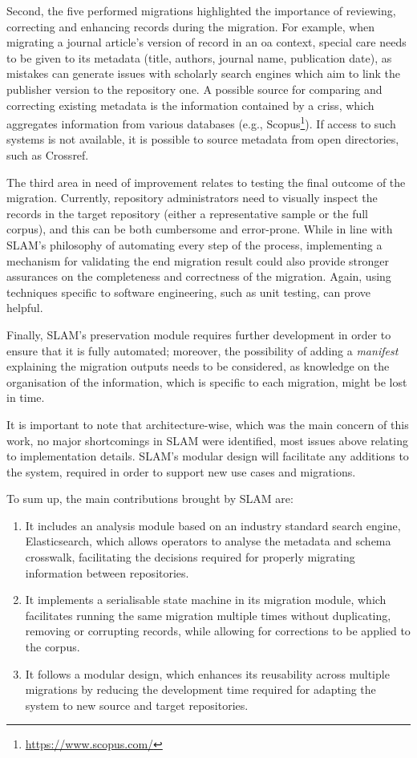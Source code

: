 Second, the five performed migrations highlighted the importance of reviewing, correcting and enhancing records during the migration. For example, when migrating a journal article's version of record in an \gls{oa} context, special care needs to be given to its metadata (title, authors, journal name, publication date), as mistakes can generate issues with scholarly search engines which aim to link the publisher version to the repository one. A possible source for comparing and correcting existing metadata is the information contained by a \glspl{cris}, which aggregates information from various databases (e.g., Scopus\footnote{\url{https://www.scopus.com/}}). If access to such systems is not available, it is possible to source metadata from open directories, such as Crossref.

The third area in need of improvement relates to testing the final outcome of the migration. Currently, repository administrators need to visually inspect the records in the target repository (either a representative sample or the full corpus), and this can be both cumbersome and error-prone. While in line with SLAM's philosophy of automating every step of the process, implementing a mechanism for validating the end migration result could also provide stronger assurances on the completeness and correctness of the migration. Again, using techniques specific to software engineering, such as unit testing, can prove helpful.

Finally, SLAM's preservation module requires further development in order to ensure that it is fully automated; moreover, the possibility of adding a \emph{manifest} explaining the migration outputs needs to be considered, as knowledge on the organisation of the information, which is specific to each migration, might be lost in time.

It is important to note that architecture-wise, which was the main concern of this work, no major shortcomings in SLAM were identified, most issues above relating to implementation details. SLAM's modular design will facilitate any additions to the system, required in order to support new use cases and migrations.

To sum up, the main contributions brought by SLAM are:
\begin{enumerate}
    \item It includes an analysis module based on an industry standard search engine, Elasticsearch, which allows operators to analyse the metadata and schema crosswalk, facilitating the decisions required for properly migrating information between repositories.
    \item It implements a serialisable state machine in its migration module, which facilitates running the same migration multiple times without duplicating, removing or corrupting records, while allowing for corrections to be applied to the corpus.
    \item It follows a modular design, which enhances its reusability across multiple migrations by reducing the development time required for adapting the system to new source and target repositories.
\end{enumerate}

